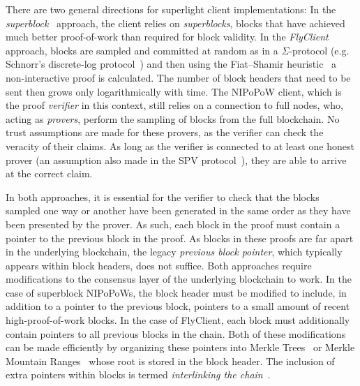 There are two general directions for superlight client implementations: In the
\emph{superblock}~\cite{nipopows,compactsuperblocks} approach, the client
relies on \emph{superblocks}, blocks that have achieved much better
proof-of-work than required for block validity. In the
\emph{FlyClient}~\cite{flyclient} approach, blocks are sampled and committed at random as in a $\Sigma$-protocol (e.g. Schnorr's discrete-log protocol~\cite{schnorr}) and then using 
the Fiat--Shamir heuristic~\cite{fiatshamir} a non-interactive proof is calculated. The number of block headers
that need to be sent then grows only logarithmically with time. The NIPoPoW
client, which is the proof \emph{verifier} in this context, still relies on a connection to full nodes,
who, acting as \emph{provers},  perform the sampling of blocks from the full
blockchain. 
No trust assumptions are made for these provers, as the
verifier can check the veracity of their claims. As long as the verifier is
connected to at least one honest prover (an assumption also made in the SPV
protocol~\cite{eclipse,eclipse-ethereum}), they are able to arrive at the correct claim.

In both approaches, it is essential for the verifier to check that the blocks
sampled one way or another have been generated in the same order as they have
been presented by the prover. As such, each block in the proof must contain a
pointer to the previous block in the proof. As blocks in these proofs are far
apart in the underlying blockchain, the legacy \emph{previous block pointer},
which typically appears within block headers, does not suffice.
Both approaches require modifications to the consensus layer of the underlying
blockchain to work. In the case of superblock NIPoPoWs, the block header must be
modified to include, in addition to a pointer to the previous block, pointers to
a small amount of recent high-proof-of-work blocks. In the case of FlyClient,
each block must additionally contain pointers to all previous blocks in the
chain. Both of these modifications can be made efficiently by organizing these
pointers into Merkle Trees~\cite{merkle} or Merkle Mountain Ranges~\cite{ct,mmr}
whose root is stored in the block header. The inclusion of extra pointers within
blocks is termed \emph{interlinking the chain}~\cite{popow}.

